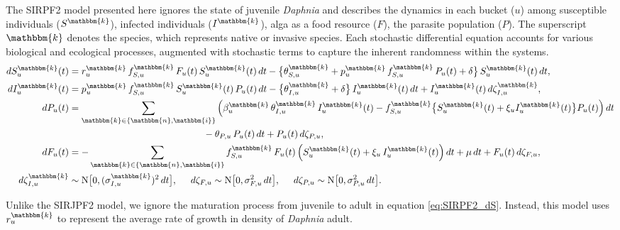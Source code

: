 \documentclass[aoas,preprint]{imsart}\usepackage[]{graphicx}\usepackage[]{xcolor}
\newcommand\unit{u}
\newcommand\species{\mathbbm{k}}
\newcommand\native{\mathbbm{n}}
\newcommand\invasive{\mathbbm{i}}
\newcommand\Normal{\mathrm{N}}
\begin{document}
The SIRPF2 model presented here ignores the state of juvenile \textit{Daphnia} and describes the dynamics in each bucket ($\unit$) among susceptible individuals ($S^{\species}$), infected individuals ($I^{\species}$), alga as a food resource ($F$), the parasite population ($P$).
The superscript $\species$ denotes the species, which represents native or invasive species.
Each stochastic differential equation accounts for various biological and ecological processes, augmented with stochastic terms to capture the inherent randomness within the systems.
{\small
\begin{align}
    dS^{\species}_{\unit}(t) &= r^{\species}_{\unit} \, f^{\species}_{S,{\unit}} \, F_{\unit}(t) \, S^{\species}_{\unit}(t)\, dt -
    \big\{
    \theta^{\species}_{S,{\unit}} + p^{\species}_{\unit} \, f^{\species}_{S,{\unit}} \, P_{\unit}(t) + \delta
    \big\}
    \, S^{\species}_{\unit}(t)\, dt,\\
    dI^{\species}_{\unit}(t) &= p^{\species}_{\unit} \, f^{\species}_{S,{\unit}}\,  S^{\species}_{\unit}(t) \, P_{\unit}(t)\, dt -
    \big\{
    \theta^{\species}_{I,{\unit}} + \delta
    \big\}
    \, I^{\species}_{\unit}(t)\, dt + I^{\species}_{\unit}(t) \, d\zeta^{\species}_{I,{\unit}},\label{eq:SIRPF2_dS}\\
    dP_{\unit}(t) &= \sum_{\species \in \{\native, \invasive\}} \left(\beta^{\species}_{\unit} \, \theta^{\species}_{I,{\unit}} \,  I^{\species}_{\unit}(t) - f^{\species}_{S,{\unit}} \big\{ S^{\species}_{\unit}(t) + \xi_{\unit} I^{\species}_{\unit}(t) \big\} P_{\unit}(t)\right) dt
    \\ \nonumber
    & \hspace{5cm} - \theta_{P,{\unit}} \, P_{\unit}(t)\, dt + P_{\unit}(t)\, d\zeta_{P,{\unit}},\\
    dF_{\unit}(t) &= - \sum_{\species \in \{\native, \invasive\}} f^{\species}_{S,{\unit}} \, F_{\unit}(t) \left(S^{\species}_{\unit}(t)+\xi_{\unit} \, I^{\species}_{\unit}(t)\right)dt  + \mu \, dt + F_{\unit}(t)\, d\zeta_{F,{\unit}},\label{eq:SIRPF2_dF}\\
d\zeta^{\species}_{I,{\unit}} &\sim \Normal \big[0, (\sigma^{\species}_{I,{\unit}})^{2}\, dt\big],
\hspace{5mm}
d\zeta_{F,{\unit}} \sim \Normal \big[0, \sigma_{F,{\unit}}^{2}\, dt\big],
\hspace{5mm}
d\zeta_{P,{\unit}} \sim \Normal \big[0, \sigma_{P,{\unit}}^{2}\, dt\big].
\end{align}
}


Unlike the SIRJPF2 model, we ignore the maturation process from juvenile to adult in equation \eqref{eq:SIRPF2_dS}.
Instead, this model uses $r^{\species}_{\unit}$ to represent the average rate of growth in density of \textit{Daphnia} adult.
\end{document}
